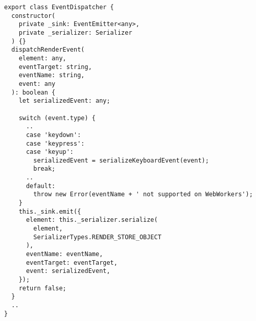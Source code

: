 \begin{verbatim}
export class EventDispatcher {
  constructor(
    private _sink: EventEmitter<any>,
    private _serializer: Serializer
  ) {}
  dispatchRenderEvent(
    element: any,
    eventTarget: string,
    eventName: string,
    event: any
  ): boolean {
    let serializedEvent: any;

    switch (event.type) {
      ..
      case 'keydown':
      case 'keypress':
      case 'keyup':
        serializedEvent = serializeKeyboardEvent(event);
        break;
      ..
      default:
        throw new Error(eventName + ' not supported on WebWorkers');
    }
    this._sink.emit({
      element: this._serializer.serialize(
        element,
        SerializerTypes.RENDER_STORE_OBJECT
      ),
      eventName: eventName,
      eventTarget: eventTarget,
      event: serializedEvent,
    });
    return false;
  }
  ..
}
\end{verbatim}
